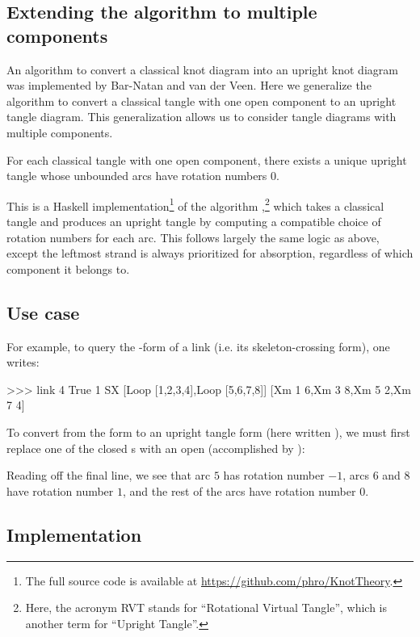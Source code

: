 \subsection{Extending the algorithm to multiple components}

An algorithm to convert a classical knot diagram into an upright knot diagram
was implemented by Bar-Natan and van der Veen. Here we generalize the algorithm
to convert a classical tangle with one open component to an upright tangle
diagram. This generalization allows us to consider tangle diagrams with multiple
components.

\begin{lemma}
        For each classical tangle with one open component, there exists a unique
        upright tangle whose unbounded arcs have rotation numbers $0$.
\end{lemma}

This is a Haskell implementation\footnote{The full source code is available at
\url{https://github.com/phro/KnotTheory}.} of the algorithm ,\footnote{Here, the
acronym RVT stands for \enquote{Rotational Virtual Tangle}, which is
another term for \enquote{Upright Tangle}.} which takes a classical tangle and
produces an upright tangle by computing a compatible choice of rotation numbers
for each arc. This follows largely the same logic as above, except the leftmost
strand is always prioritized for absorption, regardless of which component it
belongs to.

\subsection{Use case}

For example, to query the -form of a link (i.e. its skeleton-crossing
form), one writes:
\begin{code}
>>> link 4 True 1
SX [Loop [1,2,3,4],Loop [5,6,7,8]]
   [Xm 1 6,Xm 3 8,Xm 5 2,Xm 7 4]
\end{code}
To convert from the  form to an upright tangle form (here written
), we must first replace one of the closed s with an open
 (accomplished by ):
Reading off the final line, we see that arc $5$ has rotation number $-1$, arcs
$6$ and $8$ have rotation number $1$, and the rest of the arcs have rotation
number $0$.

\subsection{Implementation}


